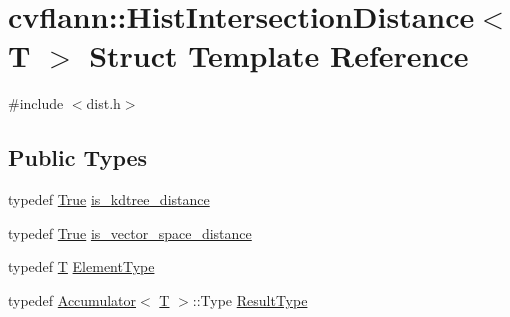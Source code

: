 \hypertarget{structcvflann_1_1HistIntersectionDistance}{\section{cvflann\-:\-:Hist\-Intersection\-Distance$<$ T $>$ Struct Template Reference}
\label{structcvflann_1_1HistIntersectionDistance}
}


{\ttfamily \#include $<$dist.\-h$>$}

\subsection*{Public Types}
\begin{DoxyCompactItemize}
\item 
typedef \hyperlink{classcvflann_1_1True}{True} \hyperlink{structcvflann_1_1HistIntersectionDistance_a46f34e34cc458f0564d4deb8b91990c3}{is\-\_\-kdtree\-\_\-distance}
\item 
typedef \hyperlink{classcvflann_1_1True}{True} \hyperlink{structcvflann_1_1HistIntersectionDistance_af92ded76070af8fd088b758012ad0289}{is\-\_\-vector\-\_\-space\-\_\-distance}
\item 
typedef \hyperlink{calib3d_8hpp_a3efb9551a871ddd0463079a808916717}{T} \hyperlink{structcvflann_1_1HistIntersectionDistance_aa4ca3b614996eaa55a9208854e8f3c07}{Element\-Type}
\item 
typedef \hyperlink{structcvflann_1_1Accumulator}{Accumulator}$<$ \hyperlink{calib3d_8hpp_a3efb9551a871ddd0463079a808916717}{T} $>$\-::Type \hyperlink{structcvflann_1_1HistIntersectionDistance_a0d4cb03d29473e933994cb132ea384db}{Result\-Type}
\end{DoxyCompactItemize}
